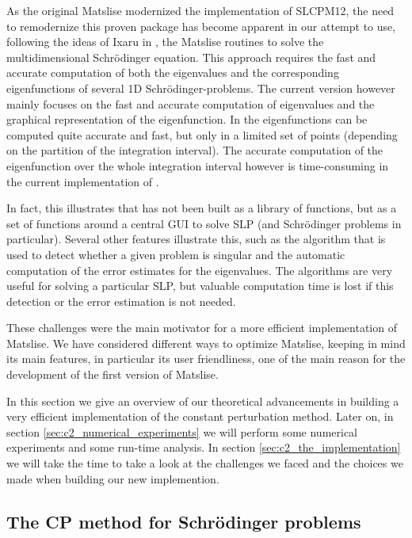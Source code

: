 As the original Matslise modernized the implementation of SLCPM12, the need to remodernize this proven package has become apparent in our attempt to use, following the ideas of Ixaru in \cite{ixaru_new_2010}, the Matslise routines to solve the multidimensional Schrödinger equation. This approach requires the fast and accurate computation of both the eigenvalues and the corresponding eigenfunctions of several 1D Schrödinger-problems. The current  version however mainly focuses on the fast and accurate computation of eigenvalues and the graphical representation of the eigenfunction. In  the eigenfunctions can be computed quite accurate and fast, but only in a limited set of points (depending on the partition of the integration interval). The accurate computation of the eigenfunction over the whole integration interval however is time-consuming in the current implementation of .

In fact, this illustrates that  has not been built as a library of functions, but as a set of functions around a central GUI to solve SLP (and Schrödinger problems in particular). Several other features illustrate this, such as the algorithm that is used to detect whether a given problem is singular and the automatic computation of the error estimates for the eigenvalues. The algorithms are very useful for solving a particular SLP, but valuable computation time is lost if this detection or the error estimation is not needed.

These challenges were the main motivator for a more efficient implementation of Matslise. We have considered different ways to optimize Matslise, keeping in mind its main features, in particular its user friendliness, one of the main reason for the development of the first version of Matslise.

In this section we give an overview of our theoretical advancements \cite{baeyens_fast_2020} in building a very efficient implementation of the constant perturbation method. Later on, in section \ref{sec:c2_numerical_experiments} we will perform some numerical experiments and some run-time analysis. In section \ref{sec:c2_the_implementation} we will take the time to take a look at the challenges we faced and the choices we made when building our new implemention.

\subsection{The CP method for Schrödinger problems}\label{the-method}

